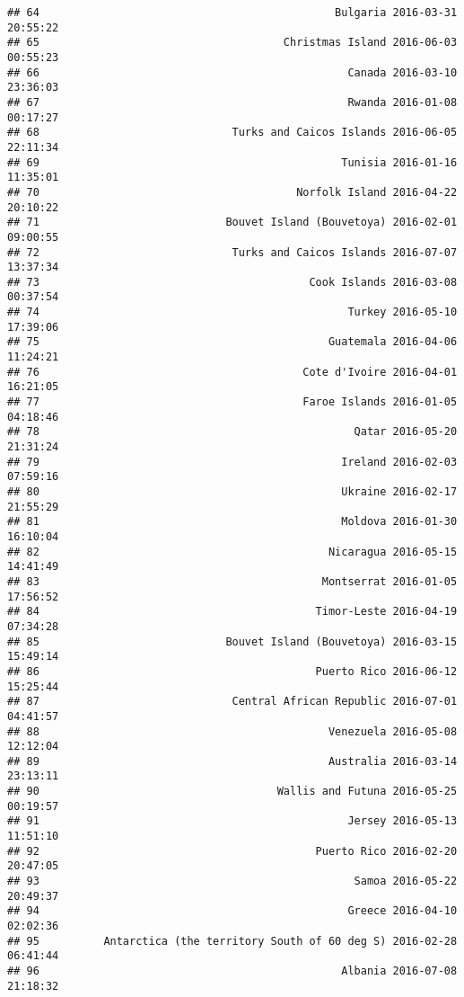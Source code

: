 \documentclass[
]{article}
\begin{document}
\begin{verbatim}
## 64                                              Bulgaria 2016-03-31 20:55:22
## 65                                      Christmas Island 2016-06-03 00:55:23
## 66                                                Canada 2016-03-10 23:36:03
## 67                                                Rwanda 2016-01-08 00:17:27
## 68                              Turks and Caicos Islands 2016-06-05 22:11:34
## 69                                               Tunisia 2016-01-16 11:35:01
## 70                                        Norfolk Island 2016-04-22 20:10:22
## 71                             Bouvet Island (Bouvetoya) 2016-02-01 09:00:55
## 72                              Turks and Caicos Islands 2016-07-07 13:37:34
## 73                                          Cook Islands 2016-03-08 00:37:54
## 74                                                Turkey 2016-05-10 17:39:06
## 75                                             Guatemala 2016-04-06 11:24:21
## 76                                         Cote d'Ivoire 2016-04-01 16:21:05
## 77                                         Faroe Islands 2016-01-05 04:18:46
## 78                                                 Qatar 2016-05-20 21:31:24
## 79                                               Ireland 2016-02-03 07:59:16
## 80                                               Ukraine 2016-02-17 21:55:29
## 81                                               Moldova 2016-01-30 16:10:04
## 82                                             Nicaragua 2016-05-15 14:41:49
## 83                                            Montserrat 2016-01-05 17:56:52
## 84                                           Timor-Leste 2016-04-19 07:34:28
## 85                             Bouvet Island (Bouvetoya) 2016-03-15 15:49:14
## 86                                           Puerto Rico 2016-06-12 15:25:44
## 87                              Central African Republic 2016-07-01 04:41:57
## 88                                             Venezuela 2016-05-08 12:12:04
## 89                                             Australia 2016-03-14 23:13:11
## 90                                     Wallis and Futuna 2016-05-25 00:19:57
## 91                                                Jersey 2016-05-13 11:51:10
## 92                                           Puerto Rico 2016-02-20 20:47:05
## 93                                                 Samoa 2016-05-22 20:49:37
## 94                                                Greece 2016-04-10 02:02:36
## 95          Antarctica (the territory South of 60 deg S) 2016-02-28 06:41:44
## 96                                               Albania 2016-07-08 21:18:32

\end{verbatim}
\end{document}
